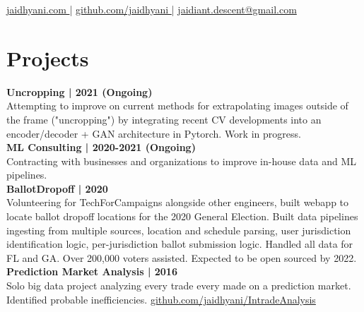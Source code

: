 \documentclass[]{resume}
\begin{document}
%
%
\lastupdated
\github

%
%
{ 
    \href{http://jaidhyani.com }{jaidhyani.com }|
    \href{http://github.com/jaidhyani}{ github.com/jaidhyani }|
    \href{mailto:jaidiant.descent@gmail.com}{ jaidiant.descent@gmail.com}
}

%
%

\begin{minipage}[t]{0.33\textwidth}



\sectionsep


\section{Projects}

\textbf{Uncropping | 2021 (Ongoing)}\\
Attempting to improve on current methods for extrapolating images
outside of the frame ("uncropping") by integrating recent CV developments
into an encoder/decoder + GAN architecture in Pytorch. Work in progress.
\\

\textbf{ML Consulting | 2020-2021 (Ongoing)}\\
Contracting with businesses and organizations to improve in-house 
data and ML pipelines. \\

\textbf{BallotDropoff | 2020}\\
Volunteering for TechForCampaigns alongside other engineers, 
built webapp to locate  ballot dropoff locations for 
the 2020 General Election. Built data pipelines ingesting from 
multiple sources, location and schedule parsing, user jurisdiction 
identification logic, per-jurisdiction ballot submission logic. 
Handled all data for FL and GA. Over 200,000 voters assisted.
Expected to be open sourced by 2022.
\\

\textbf{Prediction Market Analysis | 2016}\\
Solo big data project analyzing every trade every made on a prediction market. Identified
probable inefficiencies.
\href{http://github.com/jaidhyani/IntradeAnalysis}{github.com/jaidhyani/IntradeAnalysis }
\sectionsep


\end{minipage}
\end{document}

